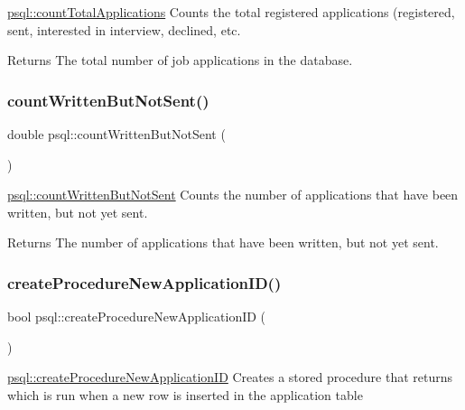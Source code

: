 \mbox{\hyperlink{classpsql_a496d0a426a1539bf9babd1dd4e9fcd96}{psql\+::count\+Total\+Applications}} Counts the total registered applications (registered, sent, interested in interview, declined, etc. 

\begin{DoxyReturn}{Returns}
The total number of job applications in the database. 
\end{DoxyReturn}
\mbox{\label{classpsql_a70ad9f4b00735a55232f46da4edd2edc}} 
\subsubsection{\texorpdfstring{count\+Written\+But\+Not\+Sent()}{countWrittenButNotSent()}}
{\footnotesize\ttfamily double psql\+::count\+Written\+But\+Not\+Sent (\begin{DoxyParamCaption}{ }\end{DoxyParamCaption})}



\mbox{\hyperlink{classpsql_a70ad9f4b00735a55232f46da4edd2edc}{psql\+::count\+Written\+But\+Not\+Sent}} Counts the number of applications that have been written, but not yet sent. 

\begin{DoxyReturn}{Returns}
The number of applications that have been written, but not yet sent. 
\end{DoxyReturn}
\mbox{\label{classpsql_ae9e3ee06f4a5ecd4178662dfa0655fe1}} 
\subsubsection{\texorpdfstring{create\+Procedure\+New\+Application\+I\+D()}{createProcedureNewApplicationID()}}
{\footnotesize\ttfamily bool psql\+::create\+Procedure\+New\+Application\+ID (\begin{DoxyParamCaption}{ }\end{DoxyParamCaption})}



\mbox{\hyperlink{classpsql_ae9e3ee06f4a5ecd4178662dfa0655fe1}{psql\+::create\+Procedure\+New\+Application\+ID}} Creates a stored procedure that returns which is run when a new row is inserted in the application table 

